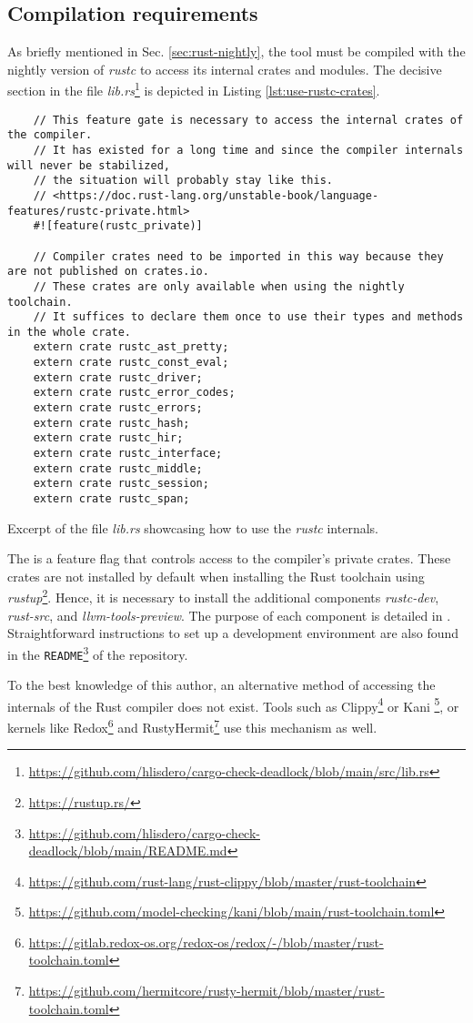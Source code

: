 \subsection{Compilation requirements}

As briefly mentioned in Sec. \ref{sec:rust-nightly}, the tool must be compiled
with the nightly version of \emph{rustc} to access its internal crates and modules.
The decisive section in the file
\emph{lib.rs}\footnote{\url{https://github.com/hlisdero/cargo-check-deadlock/blob/main/src/lib.rs}} is
depicted in Listing \ref{lst:use-rustc-crates}.

\begin{listing}
  \begin{verbatim}
    // This feature gate is necessary to access the internal crates of the compiler.
    // It has existed for a long time and since the compiler internals will never be stabilized,
    // the situation will probably stay like this.
    // <https://doc.rust-lang.org/unstable-book/language-features/rustc-private.html>
    #![feature(rustc_private)]
    
    // Compiler crates need to be imported in this way because they are not published on crates.io.
    // These crates are only available when using the nightly toolchain.
    // It suffices to declare them once to use their types and methods in the whole crate.
    extern crate rustc_ast_pretty;
    extern crate rustc_const_eval;
    extern crate rustc_driver;
    extern crate rustc_error_codes;
    extern crate rustc_errors;
    extern crate rustc_hash;
    extern crate rustc_hir;
    extern crate rustc_interface;
    extern crate rustc_middle;
    extern crate rustc_session;
    extern crate rustc_span;
  \end{verbatim}
  \caption{Excerpt of the file \emph{lib.rs} showcasing how to use the \emph{rustc} internals.}
  \label{lst:use-rustc-crates}
\end{listing}

The  is a feature flag
that controls access to the compiler's private crates.
These crates are not installed by default when installing the Rust toolchain
using \emph{rustup}\footnote{\url{https://rustup.rs/}}.
Hence, it is necessary to install the additional components \emph{rustc-dev},
\emph{rust-src}, and \emph{llvm-tools-preview}.
The purpose of each component is detailed in \cite{rustup-book}.
Straightforward instructions to set up a development environment are also found
in the \texttt{README}\footnote{\url{https://github.com/hlisdero/cargo-check-deadlock/blob/main/README.md}}
of the repository.

To the best knowledge of this author,
an alternative method of accessing the internals of the Rust compiler does not exist.
Tools such as
Clippy\footnote{\url{https://github.com/rust-lang/rust-clippy/blob/master/rust-toolchain}} or
Kani \footnote{\url{https://github.com/model-checking/kani/blob/main/rust-toolchain.toml}}, or
kernels like Redox\footnote{\url{https://gitlab.redox-os.org/redox-os/redox/-/blob/master/rust-toolchain.toml}} and
RustyHermit\footnote{\url{https://github.com/hermitcore/rusty-hermit/blob/master/rust-toolchain.toml}}
use this mechanism as well.
